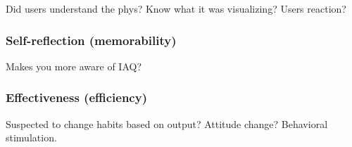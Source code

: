 Did users understand the phys? Know what it was visualizing? Users reaction?

\subsubsection{Self-reflection (memorability)}

Makes you more aware of IAQ?

\subsubsection{Effectiveness (efficiency)}

Suspected to change habits based on output? Attitude change? Behavioral stimulation.



